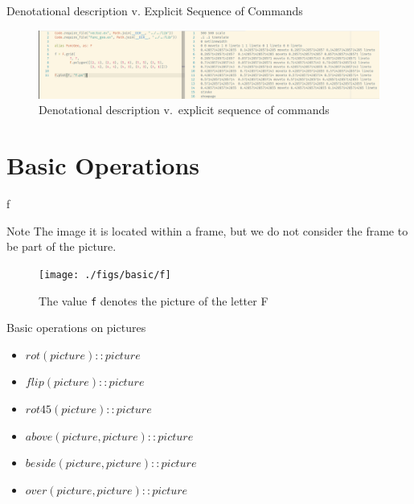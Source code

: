\documentclass{beamer}
\begin{document}
    \begin{frame}{Denotational description v. Explicit Sequence of Commands}
        \begin{figure}
            \centering
            \includegraphics[width=\textwidth]{./figs/sequence-v-denotation}
            \caption{Denotational description v.\  explicit sequence of commands\label{fig:sequence}}
        \end{figure}
    \end{frame}



    \section{Basic Operations}

    \begin{frame}{f}
        \begin{alertblock}{Note}
        The image it is located within a frame, but we do not consider the frame to be part of the picture.
        \end{alertblock}

        \begin{figure}
            \centering
            \texttt{[image: ./figs/basic/f]}
            \caption{\footnotesize The value \texttt{f} denotes the picture of the letter F\label{fig:f}}
        \end{figure}

    \end{frame}

    \begin{frame}{Basic operations on pictures}

        \begin{itemize}
            \item $rot(picture) :: picture$
            \item $flip(picture) :: picture$
            \item $rot45(picture) :: picture$
            \item $above(picture, picture) :: picture$
            \item $beside(picture, picture) :: picture$
            \item $over(picture, picture) :: picture$
        \end{itemize}

    \end{frame}
\end{document}
